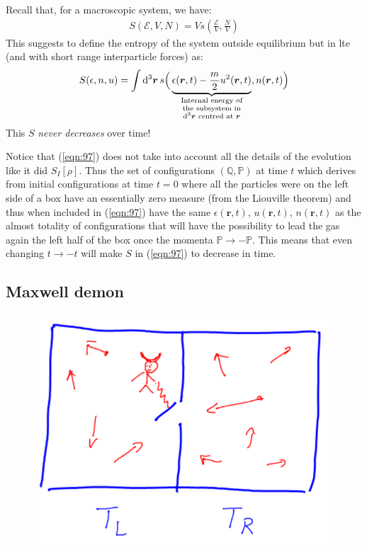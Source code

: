 \documentclass[../template.tex]{subfiles}
\begin{document}
\medskip

Recall that, for a macroscopic system, we have:
\begin{align}\label{eqn:96}
    S(\mathcal{E}, V, N) = V s\left(\frac{\mathcal{E}}{V}, \frac{N}{V}  \right)
\end{align}
This suggests to define the entropy of the system outside equilibrium but in lte (and with short range interparticle forces) as:
\begin{align}\label{eqn:97}
    S(\epsilon, n, u) = \int \dd[3]{\bm{r}} s\Big(\underbrace{\epsilon(\bm{r},t) - \frac{m}{2} u^2(\bm{r},t)}_{\parbox{7em}{\centering\scriptsize Internal energy of the subsystem in $\dd[3]{\bm{r}}$ centred at $\bm{r}$}} , n(\bm{r},t) \Big)
\end{align}
This $S$ \textit{never decreases} over time!

Notice that (\ref{eqn:97}) does not take into account all the details of the evolution like it did $S_I[\rho]$. Thus the set of configurations $(\mathbb{Q}, \mathbb{P})$ at time $t$ which derives from initial configurations at time $t=0$ where all the particles were on the left side of a box have an essentially zero measure (from the Liouville theorem) and thus when included in (\ref{eqn:97}) have the same $\epsilon(\bm{r},t)$, $u(\bm{r},t)$, $n(\bm{r},t)$ as the almost totality of configurations that will  have the possibility to lead the gas again the left half of the box once the momenta $\mathbb{P} \to -\mathbb{P}$. This means that even changing $t \to -t$ will make $S$ in (\ref{eqn:97}) to decrease in time.

\subsection{Maxwell demon}

\begin{figure}[H]
    \centering
    \includegraphics{image007.png}
    \caption{\label{fig:maxwell}}
\end{figure}
\end{document}
